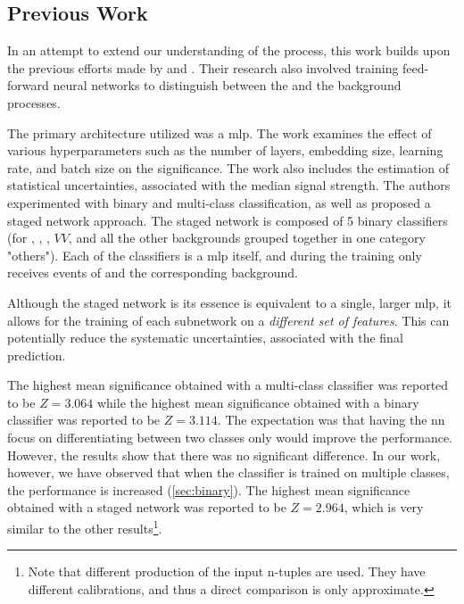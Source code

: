 \subsection{Previous Work}

In an attempt to extend our understanding of the \tth process, this work builds upon the previous efforts made by
\severin and \jan. Their research also involved training feed-forward neural networks to distinguish between the \tth
and the background processes.

The primary architecture \cite{severin} utilized was a \gls{mlp}. The work examines the effect of various
hyperparameters such as the number of layers, embedding size, learning rate, and batch size on the significance. The
work also includes the estimation of statistical uncertainties, associated with the median signal strength. The authors
experimented with binary and multi-class classification, as well as proposed a staged network approach. The staged
network is composed of 5 binary classifiers (for \ttz, \ttw, \ttbar, $VV$, and all the other backgrounds grouped
together in one category "others"). Each of the classifiers is a \gls{mlp} itself, and during the training only receives
events of \tth and the corresponding background.


Although the staged network is its essence is equivalent to a single, larger \gls{mlp}, it allows for the training of
each subnetwork on a \emph{different set of features}. This can potentially reduce the systematic uncertainties,
associated with the final prediction. %

The highest mean significance obtained with a multi-class classifier was reported to be $Z = 3.064$ while the highest
mean significance obtained with a binary classifier was reported to be $Z = 3.114$. The expectation was that having the
\gls{nn} focus on differentiating between two classes only would improve the performance. However, the results show that
there was no significant difference. In our work, however, we have observed that when the classifier is trained on
multiple classes, the performance is increased (\autoref{sec:binary}). The highest mean significance obtained with a
staged network was reported to be $Z = 2.964$, which is very similar to the other results\footnote{Note that different
    production of the input n-tuples are used. They have different calibrations, and thus a direct comparison is only
    approximate.}.





